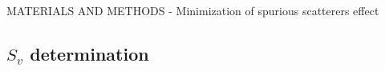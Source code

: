 \documentclass[handout]{beamer}
\begin{document}
\begin{frame}{MATERIALS AND METHODS - Minimization of spurious scatterers effect}
\begin{minipage}[c]{1\linewidth}
\begin{minipage}[c]{0.55\linewidth}
\hspace{1pc}
\end{minipage}
\end{minipage}


\end{frame}

\subsection{$S_v$ determination}
\end{document}
